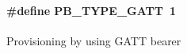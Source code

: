 \paragraph[{\texorpdfstring{P\+B\+\_\+\+T\+Y\+P\+E\+\_\+\+G\+A\+TT}{PB_TYPE_GATT}}]{\setlength{\rightskip}{0pt plus 5cm}\#define P\+B\+\_\+\+T\+Y\+P\+E\+\_\+\+G\+A\+TT~1}\hypertarget{group___m_e_s_h___p_b___t_y_p_e___d_e_f_gade963cbef42498d8200551968d3e4d19}{}\label{group___m_e_s_h___p_b___t_y_p_e___d_e_f_gade963cbef42498d8200551968d3e4d19}
Provisioning by using G\+A\+TT bearer 